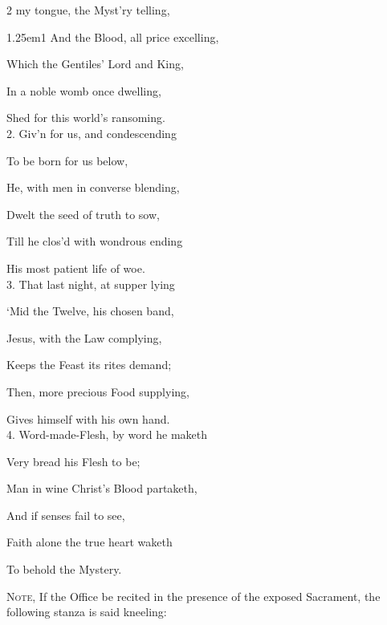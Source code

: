 \firstEvensong

\vspace{-0.25\baselineskip}


\vspace{-0.25\baselineskip}

\firstEvensongHymn\label{CorpusChristiEvensongHymn}
\begin{multicols}{2}
 my tongue, the Myst'ry telling,

\begin{hangparas}{1.25em}{1}
And the Blood, all price excelling,

Which the Gentiles’ Lord and King,

In a noble womb once dwelling,

Shed for this world’s ransoming.\\

2. Giv'n for us, and condescending

To be born for us below,

He, with men in converse blending,

Dwelt the seed of truth to sow,

Till he clos'd with wondrous ending

His most patient life of woe.\\

3. That last night, at supper lying

`Mid the Twelve, his chosen band,

Jesus, with the Law complying,

Keeps the Feast its rites demand;

Then, more precious Food supplying,

Gives himself with his own hand.\\

4. Word-made-Flesh, by word he maketh

Very bread his Flesh to be;

Man in wine Christ's Blood partaketh,

And if senses fail to see,

Faith alone the true heart waketh

To behold the Mystery.\\

\begin{rubric}
	\textsc{Note,} If the Office be recited in the presence of the exposed Sacrament, the following stanza is said kneeling:
\end{rubric}


\end{hangparas}
\end{multicols}
